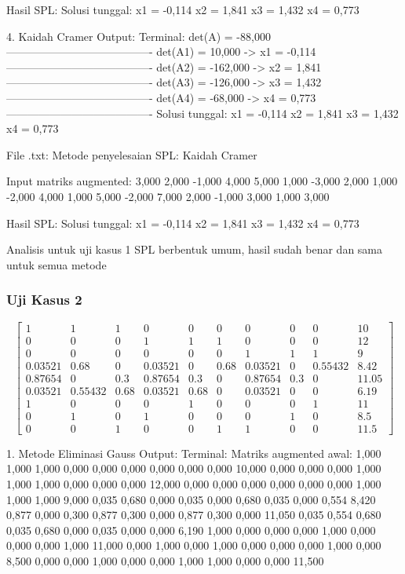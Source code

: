 \documentclass[12pt]{article}
\begin{document}
\begin{enumerate}
\begin{keluaran}
Hasil SPL:
Solusi tunggal:
x1 = -0,114
x2 = 1,841
x3 = 1,432
x4 = 0,773

4. Kaidah Cramer
Output:
Terminal:
det(A) = -88,000
----------------------------------------
det(A1) = 10,000 -> x1 = -0,114
----------------------------------------
det(A2) = -162,000 -> x2 = 1,841
----------------------------------------
det(A3) = -126,000 -> x3 = 1,432
----------------------------------------
det(A4) = -68,000 -> x4 = 0,773
----------------------------------------
Solusi tunggal:
x1 = -0,114
x2 = 1,841
x3 = 1,432
x4 = 0,773

File .txt:
Metode penyelesaian SPL: Kaidah Cramer

Input matriks augmented:
3,000	2,000	-1,000	4,000	5,000
1,000	-3,000	2,000	1,000	-2,000
4,000	1,000	5,000	-2,000	7,000
2,000	-1,000	3,000	1,000	3,000

Hasil SPL:
Solusi tunggal:
x1 = -0,114
x2 = 1,841
x3 = 1,432
x4 = 0,773
\end{keluaran}
Analisis untuk uji kasus 1 SPL berbentuk umum, hasil sudah benar dan sama untuk semua metode
\subsubsection{Uji Kasus 2}
\begin{equation}
    \begin{bmatrix}
        1 & 1 & 1 & 0 & 0 & 0 & 0 & 0 & 0 & 10 \\
        0 & 0 & 0 & 1 & 1 & 1 & 0 & 0 & 0 & 12 \\
        0 & 0 & 0 & 0 & 0 & 0 & 1 & 1 & 1 & 9 \\
        0.03521 & 0.68 & 0 & 0.03521 & 0 & 0.68 & 0.03521 & 0 & 0.55432 & 8.42 \\
        0.87654 & 0 & 0.3 & 0.87654 & 0.3 & 0 & 0.87654 & 0.3 & 0 & 11.05 \\
        0.03521 & 0.55432 & 0.68 & 0.03521 & 0.68 & 0 & 0.03521 & 0 & 0 & 6.19 \\
        1 & 0 & 0 & 0 & 1 & 0 & 0 & 0 & 1 & 11 \\
        0 & 1 & 0 & 1 & 0 & 0 & 0 & 1 & 0 & 8.5 \\
        0 & 0 & 1 & 0 & 0 & 1 & 1 & 0 & 0 & 11.5
    \end{bmatrix}
\end{equation}
\begin{keluaran}
1. Metode Eliminasi Gauss
Output:
Terminal:
Matriks augmented awal:
1,000   1,000   1,000   0,000   0,000   0,000   0,000   0,000   0,000   10,000
0,000   0,000   0,000   1,000   1,000   1,000   0,000   0,000   0,000   12,000
0,000   0,000   0,000   0,000   0,000   0,000   1,000   1,000   1,000   9,000
0,035   0,680   0,000   0,035   0,000   0,680   0,035   0,000   0,554   8,420
0,877   0,000   0,300   0,877   0,300   0,000   0,877   0,300   0,000   11,050
0,035   0,554   0,680   0,035   0,680   0,000   0,035   0,000   0,000   6,190
1,000   0,000   0,000   0,000   1,000   0,000   0,000   0,000   1,000   11,000
0,000   1,000   0,000   1,000   0,000   0,000   0,000   1,000   0,000   8,500
0,000   0,000   1,000   0,000   0,000   1,000   1,000   0,000   0,000   11,500


\end{keluaran}
\end{enumerate}
\end{document}
